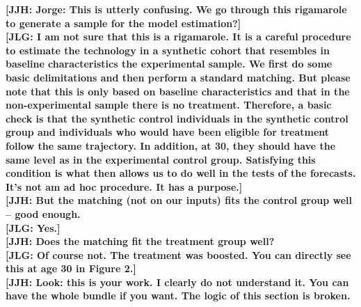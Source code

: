 \noindent \textbf{[JJH: Jorge: This is utterly confusing. We go through this rigamarole to generate a sample for the model estimation?]}\\ 

\noindent \textbf{[JLG: I am not sure that this is a rigamarole. It is a careful procedure to estimate the technology in a synthetic cohort that resembles in baseline characteristics the experimental sample. We first do some basic delimitations and then perform a standard matching. But please note that this is only based on baseline characteristics and that in the non-experimental sample there is no treatment. Therefore, a basic check is that the synthetic control individuals in the synthetic control group and individuals who would have been eligible for treatment follow the same trajectory. In addition, at 30, they should have the same level as in the experimental control group. Satisfying this condition is what then allows us to do well in the tests of the forecasts. It's not am ad hoc procedure. It has a purpose.]}\\ 

\noindent \textbf{[JJH: But the matching (not on our inputs) fits the control group well -- good enough.}\\ 
\noindent \textbf{[JLG: Yes.]}\\

\noindent \textbf{[JJH: Does the matching fit the treatment group well?}\\ 
\noindent \textbf{[JLG: Of course not. The treatment was boosted. You can directly see this at age 30 in Figure 2.]}\\

\noindent \textbf{[JJH: Look: this is your work. I clearly do not understand it. You can have the whole bundle if you want. The logic of this section is broken.}\\


